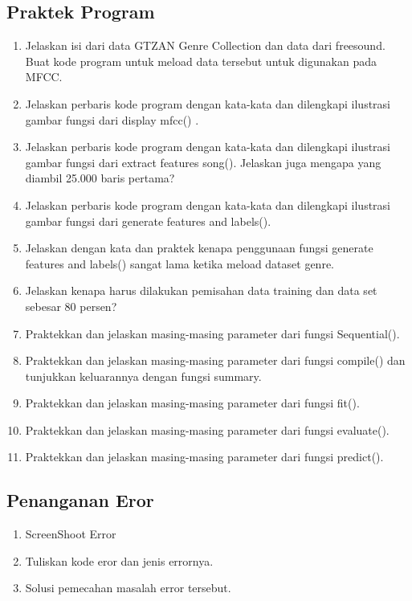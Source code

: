 \subsection{Praktek Program}
\begin{enumerate}
\item Jelaskan isi dari data GTZAN Genre Collection dan data dari freesound. Buat kode program untuk meload data tersebut untuk digunakan pada MFCC.
\item Jelaskan perbaris kode program dengan kata-kata dan dilengkapi ilustrasi gambar fungsi dari display mfcc() .
\item Jelaskan perbaris kode program dengan kata-kata dan dilengkapi ilustrasi gambar fungsi dari extract features song(). Jelaskan juga mengapa yang diambil 25.000 baris pertama?
\item Jelaskan perbaris kode program dengan kata-kata dan dilengkapi ilustrasi gambar fungsi dari generate features and labels().
\item Jelaskan dengan kata dan praktek kenapa penggunaan fungsi generate features and labels() sangat lama ketika meload dataset genre.
\item Jelaskan kenapa harus dilakukan pemisahan data training dan data set sebesar 80 persen?
\item Praktekkan dan jelaskan masing-masing parameter dari fungsi Sequential().
\item Praktekkan dan jelaskan masing-masing parameter dari fungsi compile() dan tunjukkan keluarannya dengan fungsi summary.
\item Praktekkan dan jelaskan masing-masing parameter dari fungsi fit().
\item Praktekkan dan jelaskan masing-masing parameter dari fungsi evaluate().
\item Praktekkan dan jelaskan masing-masing parameter dari fungsi predict(). 
\end{enumerate}

\subsection{Penanganan Eror}
\begin{enumerate}
\item ScreenShoot Error
\item Tuliskan kode eror dan jenis errornya.
\item Solusi pemecahan masalah error tersebut.
\end{enumerate}
